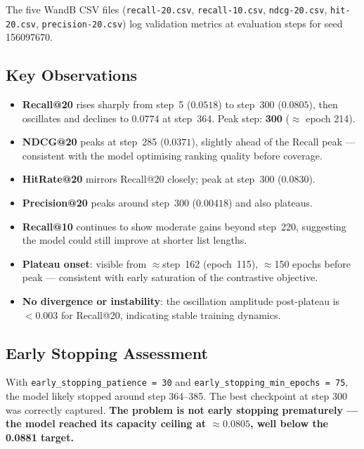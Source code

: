 \documentclass[12pt,a4paper]{article}
\begin{document}
The five WandB CSV files (\texttt{recall-20.csv}, \texttt{recall-10.csv},
\texttt{ndcg-20.csv}, \texttt{hit-20.csv}, \texttt{precision-20.csv})
log validation metrics at evaluation steps for seed 156097670.

\subsection{Key Observations}

\begin{itemize}[leftmargin=*]
  \item \textbf{Recall@20} rises sharply from step~5 ($0.0518$) to
        step~300 ($0.0805$), then oscillates and declines to $0.0774$
        at step~364.  Peak step: \textbf{300} ($\approx$ epoch 214).
  \item \textbf{NDCG@20} peaks at step~285 ($0.0371$), slightly ahead
        of the Recall peak --- consistent with the model optimising
        ranking quality before coverage.
  \item \textbf{HitRate@20} mirrors Recall@20 closely; peak at step~300
        ($0.0830$).
  \item \textbf{Precision@20} peaks around step~300 ($0.00418$) and
        also plateaus.
  \item \textbf{Recall@10} continues to show moderate gains beyond
        step~220, suggesting the model could still improve at shorter
        list lengths.
  \item \textbf{Plateau onset}: visible from $\approx$step~162
        (epoch~115), $\approx$150 epochs before peak --- consistent
        with early saturation of the contrastive objective.
  \item \textbf{No divergence or instability}: the oscillation amplitude
        post-plateau is $< 0.003$ for Recall@20, indicating stable
        training dynamics.
\end{itemize}

\subsection{Early Stopping Assessment}

With \texttt{early\_stopping\_patience = 30} and
\texttt{early\_stopping\_min\_epochs = 75}, the model likely stopped
around step 364--385.  The best checkpoint at step 300 was correctly
captured.  \textbf{The problem is not early stopping prematurely ---
the model reached its capacity ceiling at $\approx 0.0805$, well below
the 0.0881 target.}
\end{document}

